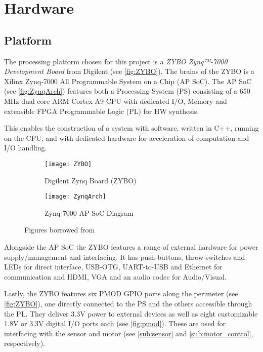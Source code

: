 \documentclass[Main]{subfiles}
\begin{document}
\section{Hardware} %
\label{sec:hardware}

	\subsection{Platform} %
	\label{sub:platform}

		The processing platform chosen for this project is a \emph{ZYBO Zynq™-7000 Development Board} from Digilent (see \autoref{fig:ZYBO}).
		The brains of the ZYBO is a Xilinx Zynq-7000 All Programmable System on a Chip (AP SoC).
		The AP SoC (see \autoref{fig:ZynqArch}) features both a Processing System (PS) consisting of a 650 MHz dual core ARM\textregistered{} Cortex A9 CPU with dedicated I/O, Memory and extensible FPGA Programmable Logic (PL) for HW synthesis.

		This enables the construction of a system with software, written in C++, running on the CPU, and with dedicated hardware for acceleration of computation and I/O handling.
		\begin{figure}[H]
			\centering
			\begin{subfigure}[b]{0.55\linewidth}
				\texttt{[image: ZYBO]}
				\caption{Digilent Zynq Board (ZYBO)}
				\label{fig:ZYBO}
			\end{subfigure}		
			\begin{subfigure}[b]{0.4\linewidth}
				\texttt{[image: ZynqArch]}
				\caption{Zynq-7000 AP SoC Diagram}
				\label{fig:ZynqArch}
			\end{subfigure}
			\caption{Figures borrowed from \cite{Digilent2014}}		
		\end{figure}

		Alongside the AP SoC the ZYBO features a range of external hardware for power supply/management and interfacing.
		It has push-buttons, throw-switches and LEDs for direct interface, USB-OTG, UART-to-USB and Ethernet for communication and HDMI, VGA and an audio codec for Audio/Visual.

		Lastly, the ZYBO features six PMOD GPIO ports along the perimeter (see \autoref{fig:ZYBO}), one directly connected to the PS and the others accessible through the PL.
		They deliver 3.3V power to external devices as well as eight customizable 1.8V or 3.3V digital I/O ports each (see \autoref{fig:pmod}).
		These are used for interfacing with the sensor and motor (see \autoref{sub:sensor} and \autoref{sub:motor_control}, respectively).
\end{document}

